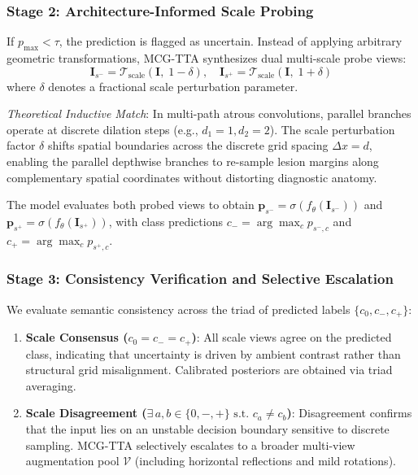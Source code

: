 ﻿\documentclass[journal]{IEEEtran}
\begin{document}
\subsubsection{Stage 2: Architecture-Informed Scale Probing}
If $p_{\max} < \tau$, the prediction is flagged as uncertain. Instead of applying arbitrary geometric transformations, MCG-TTA synthesizes dual multi-scale probe views:
\begin{equation}
\mathbf{I}_{s^-} = \mathcal{T}_{\text{scale}}(\mathbf{I}, \; 1 - \delta), \quad \mathbf{I}_{s^+} = \mathcal{T}_{\text{scale}}(\mathbf{I}, \; 1 + \delta)
\label{eq:scale_probes}
\end{equation}
where $\delta$ denotes a fractional scale perturbation parameter.

\emph{Theoretical Inductive Match}: In multi-path atrous convolutions, parallel branches operate at discrete dilation steps (e.g., $d_1 = 1, d_2 = 2$). The scale perturbation factor $\delta$ shifts spatial boundaries across the discrete grid spacing $\Delta x = d$, enabling the parallel depthwise branches to re-sample lesion margins along complementary spatial coordinates without distorting diagnostic anatomy.

The model evaluates both probed views to obtain $\mathbf{p}_{s^-} = \sigma(f_\theta(\mathbf{I}_{s^-}))$ and $\mathbf{p}_{s^+} = \sigma(f_\theta(\mathbf{I}_{s^+}))$, with class predictions $c_- = \arg\max_c p_{s^-, c}$ and $c_+ = \arg\max_c p_{s^+, c}$.

\subsubsection{Stage 3: Consistency Verification and Selective Escalation}
We evaluate semantic consistency across the triad of predicted labels $\{c_0, c_-, c_+\}$:
\begin{enumerate}
\item \textbf{Scale Consensus ($c_0 = c_- = c_+$)}: All scale views agree on the predicted class, indicating that uncertainty is driven by ambient contrast rather than structural grid misalignment. Calibrated posteriors are obtained via triad averaging.
\item \textbf{Scale Disagreement ($\exists \, a, b \in \{0, -, +\} \text{ s.t. } c_a \ne c_b$)}: Disagreement confirms that the input lies on an unstable decision boundary sensitive to discrete sampling. MCG-TTA selectively escalates to a broader multi-view augmentation pool $\mathcal{V}$ (including horizontal reflections and mild rotations).
\end{enumerate}
\end{document}
